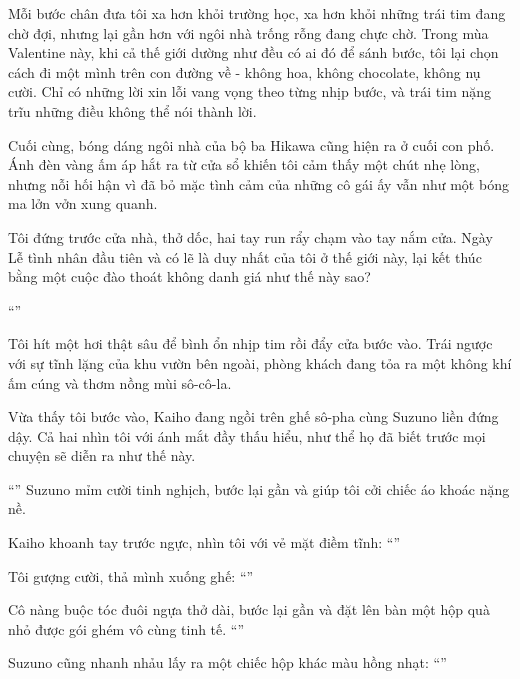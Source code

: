 \documentclass[../main.tex]{subfiles}
\begin{document}
Mỗi bước chân đưa tôi xa hơn khỏi trường học, xa hơn khỏi những trái tim đang chờ đợi, nhưng lại gần hơn với ngôi nhà trống rỗng đang chực chờ. Trong mùa Valentine này, khi cả thế giới dường như đều có ai đó để sánh bước, tôi lại chọn cách đi một mình trên con đường về - không hoa, không chocolate, không nụ cười. Chỉ có những lời xin lỗi vang vọng theo từng nhịp bước, và trái tim nặng trĩu những điều không thể nói thành lời.

Cuối cùng, bóng dáng ngôi nhà của bộ ba Hikawa cũng hiện ra ở cuối con phố. Ánh đèn vàng ấm áp hắt ra từ cửa sổ khiến tôi cảm thấy một chút nhẹ lòng, nhưng nỗi hối hận vì đã bỏ mặc tình cảm của những cô gái ấy vẫn như một bóng ma lởn vởn xung quanh.

Tôi đứng trước cửa nhà, thở dốc, hai tay run rẩy chạm vào tay nắm cửa. Ngày Lễ tình nhân đầu tiên và có lẽ là duy nhất của tôi ở thế giới này, lại kết thúc bằng một cuộc đào thoát không danh giá như thế này sao?

``''

Tôi hít một hơi thật sâu để bình ổn nhịp tim rồi đẩy cửa bước vào. Trái ngược với sự tĩnh lặng của khu vườn bên ngoài, phòng khách đang tỏa ra một không khí ấm cúng và thơm nồng mùi sô-cô-la.

Vừa thấy tôi bước vào, Kaiho đang ngồi trên ghế sô-pha cùng Suzuno liền đứng dậy. Cả hai nhìn tôi với ánh mắt đầy thấu hiểu, như thể họ đã biết trước mọi chuyện sẽ diễn ra như thế này.

``'' Suzuno mỉm cười tinh nghịch, bước lại gần và giúp tôi cởi chiếc áo khoác nặng nề.

Kaiho khoanh tay trước ngực, nhìn tôi với vẻ mặt điềm tĩnh: ``''

Tôi gượng cười, thả mình xuống ghế: ``''

Cô nàng buộc tóc đuôi ngựa thở dài, bước lại gần và đặt lên bàn một hộp quà nhỏ được gói ghém vô cùng tinh tế. ``''

Suzuno cũng nhanh nhảu lấy ra một chiếc hộp khác màu hồng nhạt: ``''
\end{document}
